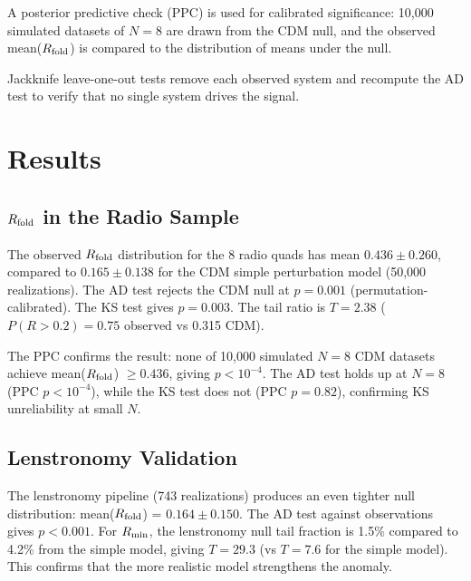 \documentclass[12pt]{article}
\newcommand{\rfold}{\ensuremath{R_{\rm fold}}}
\newcommand{\rmin}{\ensuremath{R_{\rm min}}}
\begin{document}
A posterior predictive check (PPC) is used for calibrated significance:
10,000 simulated datasets of $N=8$ are drawn from the CDM null,
and the observed mean(\rfold{}) is compared to the distribution
of means under the null.

Jackknife leave-one-out tests remove each observed system and
recompute the AD test to verify that no single system drives the signal.

\section{Results}
\label{sec:results}

\subsection{\rfold{} in the Radio Sample}
\label{sec:rfold}

The observed \rfold{} distribution for the 8 radio quads has mean
$0.436 \pm 0.260$, compared to $0.165 \pm 0.138$ for the CDM
simple perturbation model (50,000 realizations).
The AD test rejects the CDM null at $p = 0.001$ (permutation-calibrated).
The KS test gives $p = 0.003$.
The tail ratio is $T = 2.38$ ($P(R > 0.2) = 0.75$ observed vs 0.315 CDM).

The PPC confirms the result: none of 10,000 simulated $N=8$ CDM datasets
achieve mean(\rfold{}) $\ge 0.436$, giving $p < 10^{-4}$.
The AD test holds up at $N=8$ (PPC $p < 10^{-4}$), while the KS test
does not (PPC $p = 0.82$), confirming KS unreliability at small $N$.


\subsection{Lenstronomy Validation}
\label{sec:lens_results}

The lenstronomy pipeline (743 realizations) produces an even tighter
null distribution: mean(\rfold{}) = $0.164 \pm 0.150$.
The AD test against observations gives $p < 0.001$.
For \rmin{}, the lenstronomy null tail fraction is 1.5\%
compared to 4.2\% from the simple model, giving $T = 29.3$
(vs $T = 7.6$ for the simple model).
This confirms that the more realistic model strengthens the anomaly.
\end{document}
